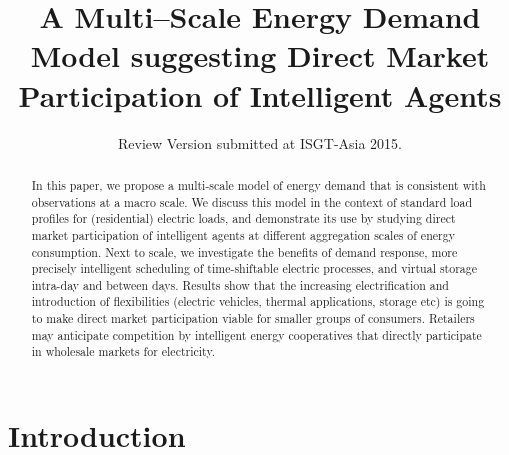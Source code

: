 \documentclass[conference]{IEEEtran}
\begin{document}
\title{A Multi--Scale Energy Demand Model suggesting Direct Market Participation of Intelligent Agents}
\author{Review Version submitted at ISGT-Asia 2015.%
}

\maketitle

\begin{abstract} In this paper, we propose a multi-scale model of energy demand that is consistent with observations at a macro scale. We discuss this model in the context of standard load profiles for (residential) electric loads, and demonstrate its use by studying direct market participation of intelligent agents at different aggregation scales of energy consumption. Next to scale, we investigate the benefits of demand response, more precisely intelligent scheduling of time-shiftable electric processes, and virtual storage intra-day and between days. Results show that the increasing electrification and introduction of flexibilities (electric vehicles, thermal applications, storage etc) is going to make direct market participation viable for smaller groups of consumers. Retailers may anticipate competition by intelligent energy cooperatives that directly participate in wholesale markets for electricity.
\end{abstract}
\IEEEpeerreviewmaketitle

\section{Introduction}
\label{sec:Introduction}
\end{document}
